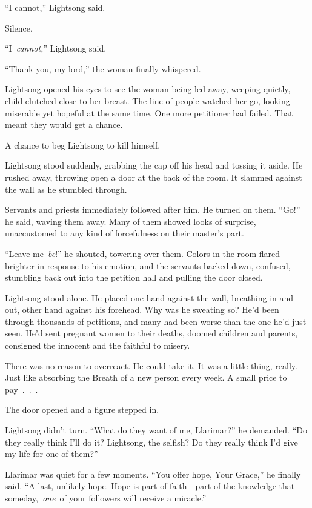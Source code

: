“I cannot,” Lightsong said.

Silence.

“I~\textit{cannot,}” Lightsong said.

“Thank you, my lord,” the woman finally whispered.

Lightsong opened his eyes to see the woman being led away, weeping quietly, child clutched close to her breast. The line of people watched her go, looking miserable yet hopeful at the same time. One more petitioner had failed. That meant they would get a chance.

A chance to beg Lightsong to kill himself.

Lightsong stood suddenly, grabbing the cap off his head and tossing it aside. He rushed away, throwing open a door at the back of the room. It slammed against the wall as he stumbled through.

Servants and priests immediately followed after him. He turned on them. “Go!” he said, waving them away. Many of them showed looks of surprise, unaccustomed to any kind of forcefulness on their master’s part.

“Leave me~\textit{be}!” he shouted, towering over them. Colors in the room flared brighter in response to his emotion, and the servants backed down, confused, stumbling back out into the petition hall and pulling the door closed.

Lightsong stood alone. He placed one hand against the wall, breathing in and out, other hand against his forehead. Why was he sweating so? He’d been through thousands of petitions, and many had been worse than the one he’d just seen. He’d sent pregnant women to their deaths, doomed children and parents, consigned the innocent and the faithful to misery.

There was no reason to overreact. He could take it. It was a little thing, really. Just like absorbing the Breath of a new person every week. A small price to pay~.~.~.

The door opened and a figure stepped in.

Lightsong didn’t turn. “What do they want of me, Llarimar?” he demanded. “Do they really think I’ll do it? Lightsong, the selfish? Do they really think I’d give my life for one of them?”

Llarimar was quiet for a few moments. “You offer hope, Your Grace,” he finally said. “A last, unlikely hope. Hope is part of faith—part of the knowledge that someday,~\textit{one}~of your followers will receive a miracle.”

